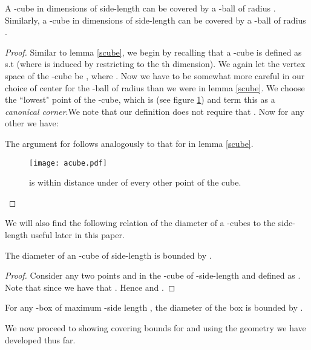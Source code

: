 \documentclass[11pt]{myclass}
\begin{document}
\begin{lemma}\label{acube}
A -cube in  dimensions of side-length  can be covered by a -ball of radius . 
Similarly, a -cube in  dimensions of side-length  can be covered by a -ball
of radius . 
\end{lemma}

\begin{proof}
Similar to lemma \ref{scube}, we begin by recalling that a -cube is defined as  s.t  (where  is
induced by restricting  to the th dimension). We again let the vertex space of the -cube be , where . Now we have to be somewhat more careful in our choice of center for the -ball  of
radius  than we were in lemma \ref{scube}. We choose the ``lowest" point of the -cube, which is  (see figure \ref{fig:acube})
and term this as a \emph{canonical corner}.We note that our definition does not require that . Now for any other  we have:
 
The argument for  follows analogously to that for  in lemma \ref{scube}. 

\begin{figure}[H]
  \begin{center}
    \texttt{[image: acube.pdf]}
  \end{center}
  \caption{ is within  distance under  of every other point of the cube.}
  \label{fig:acube}
\end{figure}
\end{proof}


We will also find the following relation of the diameter of a -cubes to the  side-length useful later in this paper.

\begin{lemma}\label{diamtolen}
The diameter of an -cube of side-length  is bounded by . 
\end{lemma}
\begin{proof}
Consider any two points  and  in the -cube of -side-length  
and defined as . Note that since  we have that .
Hence  and .
\end{proof}
\begin{corollary}
For any -box of maximum -side length , the diameter of the box is bounded by .
\end{corollary}



We now proceed to showing covering bounds for  and  using the geometry we have developed thus far.
\end{document}
